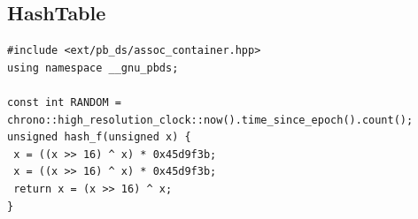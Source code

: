 \documentclass[a4paper,11pt,oneside]{article}
\begin{document}
\begin{multicols*}{\COLS}
\subsection{HashTable}
\begin{lstlisting}
#include <ext/pb_ds/assoc_container.hpp>
using namespace __gnu_pbds;

const int RANDOM = chrono::high_resolution_clock::now().time_since_epoch().count();
unsigned hash_f(unsigned x) {
 x = ((x >> 16) ^ x) * 0x45d9f3b;
 x = ((x >> 16) ^ x) * 0x45d9f3b;
 return x = (x >> 16) ^ x;
}


\end{lstlisting}
\end{multicols*}
\end{document}

